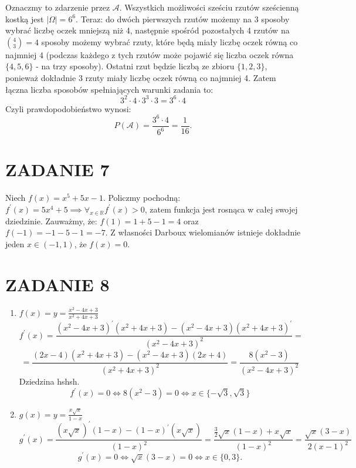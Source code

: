 \documentclass{article}
\begin{document}
Oznaczmy to zdarzenie przez \(\mathcal{A}\). 
Wszystkich możliwości sześciu rzutów sześcienną kostką jest \( |\Omega| = 6^6\). Teraz: do dwóch pierwszych rzutów możemy na 3 sposoby wybrać liczbę oczek mniejszą niż 4, następnie spośród pozostałych 4 rzutów na \(\binom{4}{3} = 4\) sposoby możemy wybrać rzuty, które będą miały liczbę oczek równą co najmniej 4 (podczas każdego z tych rzutów może pojawić się liczba oczek równa \(\{4, 5, 6\}\) - na trzy sposoby). Ostatni rzut będzie liczbą ze zbioru \(\{ 1, 2, 3\}\), ponieważ dokładnie 3 rzuty miały liczbę oczek równą co najmniej 4. Zatem łączna liczba sposobów spełniających warunki zadania to:
\[
    3^2 \cdot 4 \cdot 3^3 \cdot 3 = 3^6 \cdot 4
\]
Czyli prawdopodobieństwo wynosi:
\[
    P(\mathcal{{A}}) = \frac{3^6 \cdot 4}{6^6} = \frac{1}{16}.
\]

\section*{ZADANIE 7}
Niech \(f(x) = x^5 + 5x-1\). Policzmy pochodną: \(f^\prime (x) = 5x^4 + 5 \implies \forall_{x\in\mathbb{R}} f^\prime (x) > 0\), zatem funkcja jest rosnąca w całej swojej dziedzinie. Zauważmy, że:
\(f(1) = 1+5-1=4\) oraz \(f(-1) = -1-5-1=-7\). Z własności Darboux wielomianów istnieje dokładnie jeden \(x\in(-1, 1)\), że \(f(x) = 0\). 


\section*{ZADANIE 8}

\begin{enumerate}
    \item \(f(x) = y = \frac{x^2 - 4x + 3}{x^2 + 4x + 3}\)
    \[
        f^\prime(x) = \frac{(x^2 - 4x + 3)^\prime (x^2 + 4x + 3) - (x^2 - 4x + 3)(x^2 + 4x + 3)^\prime }{(x^2 - 4x + 3)^2} = 
    \]
    \[
        = \frac{(2x-4)(x^2 + 4x + 3) - (x^2 - 4x + 3)(2x+4)}{(x^2 + 4x + 3)^2}  = \frac{8 (x^{2} - 3)}{(x^2 - 4x + 3)^2}
    \]
    Dziedzina hshsh.
    \[
        f^\prime (x) = 0 \iff 8(x^2 - 3) = 0 \iff  x \in \{ -\sqrt{3}, \sqrt{3} \} 
    \]

    \item \(g(x) = y = \frac{x\sqrt{x} }{1-x}\) 
    \[
        g^\prime (x) = \frac{(x\sqrt{x} )^\prime (1-x)-(1-x)^\prime (x\sqrt{x} )}{(1-x)^2} = \frac{\frac{3}{2}\sqrt{x} (1-x) + x\sqrt{x} }{(1-x)^2}  = \frac{\sqrt{x} (3 - x)}{2 (x - 1)^{2}}
    \]
    \[
        g^\prime (x) = 0 \iff \sqrt{x} (3-x) = 0 \iff x \in \{0, 3\}.
    \]
\end{enumerate}
\end{document}
